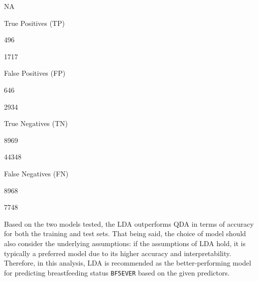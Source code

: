 \documentclass[
]{article}
\begin{document}
NA

True Positives (TP)

496

1717

False Positives (FP)

646

2934

True Negatives (TN)

8969

44348

False Negatives (FN)

8968

7748

Based on the two models tested, the LDA outperforms QDA in terms of
accuracy for both the training and test sets. That being said, the
choice of model should also consider the underlying assumptions: if the
assumptions of LDA hold, it is typically a preferred model due to its
higher accuracy and interpretability.\\
Therefore, in this analysis, LDA is recommended as the better-performing
model for predicting breastfeeding status \texttt{BF5EVER} based on the
given predictors.
\end{document}
